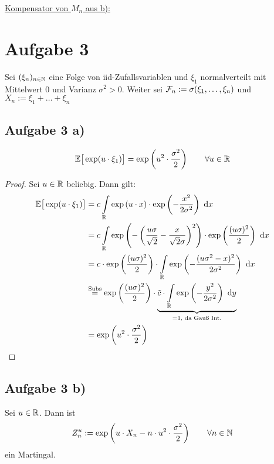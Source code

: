 \documentclass[12pt,a4paper]{article}
\begin{document}
\underline{Kompensator von $M_n$ aus b):}\\

\section*{Aufgabe 3}
Sei $(\xi_n)_{n\in\mathbb{N}}$ eine Folge von iid-Zufallsvariablen und $\xi_1$ normalverteilt mit Mittelwert 0 und Varianz $\sigma^2>0$. Weiter sei $\mathcal{F}_n:=\sigma(\xi_1,\ldots,\xi_n)$ und\\ $X_n:=\xi_1+\ldots+\xi_n$

\subsection*{Aufgabe 3 a)}
\begin{align*}
\mathbb{E}\big[\exp(u\cdot\xi_1)\big]=\exp\left(u^2\cdot\frac{\sigma^2}{2}\right)\qquad\forall u\in\mathbb{R}
\end{align*}

\begin{proof}
Sei $u\in\mathbb{R}$ beliebig. Dann gilt:
\begin{align*}
\mathbb{E}\big[\exp(u\cdot\xi_1)\big]
&=c\int\limits_{\mathbb{R}} \exp\left(u\cdot x\right)\cdot \exp\left(-\frac{x^2}{2\sigma^2}\right)\text{ d} x\\
&=c\int\limits_{\mathbb{R}} \exp\left(-\left(\frac{u\sigma}{\sqrt{2}}-\frac{x}{\sqrt{2}\sigma}\right)^2\right) \cdot\exp\left(\frac{(u\sigma)^2}{2}\right)\text{ d} x\\
&=c \cdot \exp\left(\frac{(u\sigma)^2}{2}\right)\cdot\int\limits_{\mathbb{R}} \exp\left(-\frac{(u\sigma^2-x)^2}{2\sigma^2}\right)\text{ d} x\\
&\stackrel{\text{Subs}}{=}\exp\left(\frac{(u\sigma)^2}{2}\right)\cdot \underbrace{\tilde{c}\cdot\int\limits_{\mathbb{R}} \exp\left(-\frac{y^2}{2\sigma^2}\right)\text{ d} y}_{=1\text{, da Gauß Int.}}\\
&=\exp\left(u^2\cdot\frac{\sigma^2}{2}\right)
\end{align*}
\end{proof}

\subsection*{Aufgabe 3 b)}
Sei $u\in\mathbb{R}$. Dann ist
\begin{align*}
Z_n^u:=\exp\left(u\cdot X_n-n\cdot u^2\cdot\frac{\sigma^2}{2}\right)\qquad\forall n\in\mathbb{N}
\end{align*}
ein Martingal.
\end{document}

